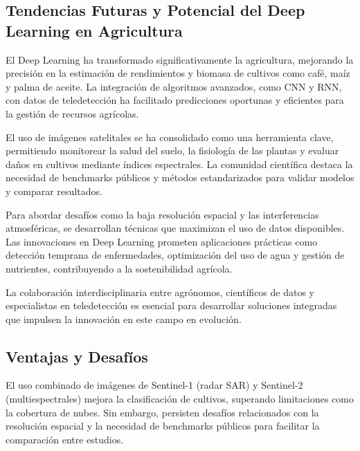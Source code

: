 \subsection{Tendencias Futuras y Potencial del Deep Learning en Agricultura}

El Deep Learning ha transformado significativamente la agricultura, mejorando la precisión en la estimación de rendimientos y biomasa de cultivos como café, maíz y palma de aceite. La integración de algoritmos avanzados, como CNN y RNN, con datos de teledetección ha facilitado predicciones oportunas y eficientes para la gestión de recursos agrícolas.

El uso de imágenes satelitales se ha consolidado como una herramienta clave, permitiendo monitorear la salud del suelo, la fisiología de las plantas y evaluar daños en cultivos mediante índices espectrales. La comunidad científica destaca la necesidad de benchmarks públicos y métodos estandarizados para validar modelos y comparar resultados.

Para abordar desafíos como la baja resolución espacial y las interferencias atmosféricas, se desarrollan técnicas que maximizan el uso de datos disponibles. Las innovaciones en Deep Learning prometen aplicaciones prácticas como detección temprana de enfermedades, optimización del uso de agua y gestión de nutrientes, contribuyendo a la sostenibilidad agrícola.

La colaboración interdisciplinaria entre agrónomos, científicos de datos y especialistas en teledetección es esencial para desarrollar soluciones integradas que impulsen la innovación en este campo en evolución.

\subsection{Ventajas y Desafíos}
El uso combinado de imágenes de Sentinel-1 (radar SAR) y Sentinel-2 (multiespectrales) mejora la clasificación de cultivos, superando limitaciones como la cobertura de nubes. Sin embargo, persisten desafíos relacionados con la resolución espacial y la necesidad de benchmarks públicos para facilitar la comparación entre estudios.

